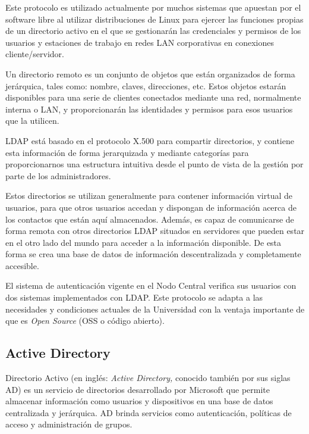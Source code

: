 Este protocolo es utilizado actualmente por muchos sistemas que apuestan por el software libre al utilizar distribuciones de Linux para ejercer las funciones propias de un directorio activo en el que se gestionarán las credenciales y permisos de los usuarios y estaciones de trabajo en redes LAN corporativas en conexiones cliente/servidor.

Un directorio remoto es un conjunto de objetos que están organizados de forma jerárquica, tales como: nombre, claves, direcciones, etc. Estos objetos estarán disponibles para una serie de clientes conectados mediante una red, normalmente interna o LAN, y proporcionarán las identidades y permisos para esos usuarios que la utilicen.

LDAP está basado en el protocolo X.500 para compartir directorios, y contiene esta información de forma jerarquizada y mediante categorías para proporcionarnos una estructura intuitiva desde el punto de vista de la gestión por parte de los administradores.

Estos directorios se utilizan generalmente para contener información virtual de usuarios, para que otros usuarios accedan y dispongan de información acerca de los contactos que están aquí almacenados. Además, es capaz de comunicarse de forma remota con otros directorios LDAP situados en servidores que pueden estar en el otro lado del mundo para acceder a la información disponible. De esta forma se crea una base de datos de información descentralizada y completamente accesible.
 
El sistema de autenticación vigente en el Nodo Central verifica sus usuarios con dos sistemas implementados con LDAP. Este protocolo se adapta a las necesidades y condiciones actuales de la Universidad con la ventaja importante de que es \textit{Open Source} (OSS o código abierto).


\subsection{Active Directory}
Directorio Activo (en inglés: \textit{Active Directory,} conocido también por sus siglas AD) es un servicio de directorios desarrollado por Microsoft que permite almacenar información como usuarios y dispositivos en una base de datos centralizada y jerárquica. AD brinda servicios como autenticación, políticas de acceso y administración de grupos.

